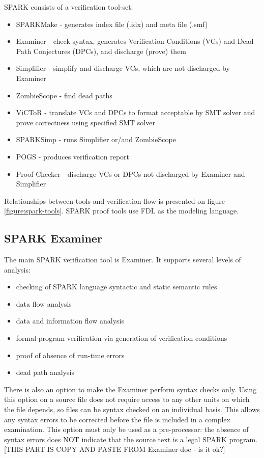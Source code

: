 SPARK consists of a verification tool-set:
\begin{itemize}
	\item SPARKMake - generates index file (.idx) and meta file (.smf)
	\item Examiner - check syntax, generates Verification Conditions (VCs) and Dead Path Conjectures (DPCs), and discharge (prove) them
	\item Simplifier - simplify and discharge VCs, which are not discharged by Examiner
	\item ZombieScope - find dead paths
	\item ViCToR - translate VCs and DPCs to format acceptable by SMT solver and prove correctness using specified SMT solver
	\item SPARKSimp - runs Simplifier or/and ZombieScope
	\item POGS - produces verification report
	\item Proof Checker - discharge VCs or DPCs not discharged by Examiner and Simplifier
\end{itemize}

Relationships between tools and verification flow is presented on figure \ref{figure:spark-tools}. SPARK proof tools use FDL as the modeling language. 



\subsection{SPARK Examiner}
\label{verification:examiner}

The main SPARK verification tool is Examiner. It supports several levels of analysis:
\begin{itemize}
	\item checking of SPARK language syntactic and static semantic rules
	\item data flow analysis
	\item data and information flow analysis
	\item formal program verification via generation of verification conditions
	\item proof of absence of run-time errors
	\item dead path analysis
\end{itemize}

There is also an option to make the Examiner perform syntax checks only. Using this option on a source file does not require access to any other units on which the file depends, so files can be syntax checked on an individual basis. This allows any syntax errors to be corrected before the file is included in a complex examination. This option must only be used as a pre-processor: the absence of syntax errors does NOT indicate that the source text is a legal SPARK program. \cite{Examiner:Online} [THIS PART IS COPY AND PASTE FROM Examiner doc - is it ok?]


